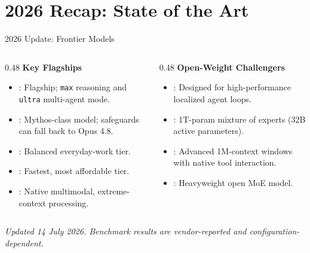 
\section{2026 Recap: State of the Art}

\begin{frame}{2026 Update: Frontier Models}
  \begin{columns}[T, onlytextwidth]
    \begin{column}{0.48\textwidth}
      \textbf{Key Flagships}
      \begin{itemize}\setlength{\itemsep}{1pt}
        \item {}: Flagship; \texttt{max} reasoning and \texttt{ultra} multi-agent mode.
        \item {}: Mythos-class model; safeguards can fall back to Opus 4.8.
        \item {}: Balanced everyday-work tier.
        \item {}: Fastest, most affordable tier.
        \item {}: Native multimodal, extreme-context processing.
      \end{itemize}
    \end{column}
    \hfill
    \begin{column}{0.48\textwidth}
      \textbf{Open-Weight Challengers}
      \begin{itemize}\setlength{\itemsep}{1pt}
        \item {}: Designed for high-performance localized agent loops.
        \item {}: 1T-param mixture of experts (32B active parameters).
        \item {}: Advanced 1M-context windows with native tool interaction.
        \item {}: Heavyweight open MoE model.
      \end{itemize}
    \end{column}
  \end{columns}
  \vspace{0.6em}
  \centering\tiny\textit{Updated 14 July 2026. Benchmark results are vendor-reported and configuration-dependent.}
\end{frame}

